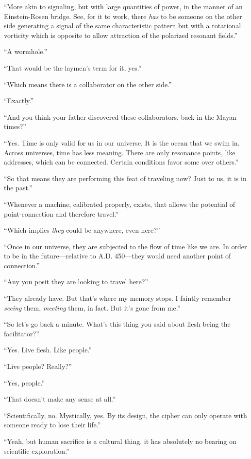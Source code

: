 \documentclass[
]{article}
\begin{document}
``More akin to signaling, but with large quantities of power, in the
manner of an Einstein-Rosen bridge. See, for it to work, there
\emph{has} to be someone on the other side generating a signal of the
same characteristic pattern but with a rotational vorticity which is
opposite to allow attraction of the polarized resonant fields.''

``A wormhole.''

``That would be the laymen's term for it, yes.''

``Which means there is a collaborator on the other side.''

``Exactly.''

``And you think your father discovered these collaborators, back in the
Mayan times?''

``Yes. Time is only valid for us in our universe. It is the ocean that
we swim in. Across universes, time has less meaning. There are only
resonance points, like addresses, which can be connected. Certain
conditions favor some over others.''

``So that means they are performing this feat of traveling now? Just to
us, it is in the past.''

``Whenever a machine, calibrated properly, exists, that allows the
potential of point-connection and therefore travel.''

``Which implies \emph{they} could be anywhere, even here?''

``Once in our universe, they are subjected to the flow of time like we
are. In order to be in the future---relative to A.D. 450---they would
need another point of connection.''

``Any you posit they are looking to travel here?''

``They already have. But that's where my memory stops. I faintly
remember \emph{seeing} them, \emph{meeting} them, in fact. But it's gone
from me.''

``So let's go back a minute. What's this thing you said about flesh
being the facilitator?''

``Yes. Live flesh. Like people.''

``Live people? Really?''

``Yes, people.''

``That doesn't make any sense at all.''

``Scientifically, no. Mystically, yes. By its design, the cipher can
only operate with someone ready to lose their life.''

``Yeah, but human sacrifice is a cultural thing, it has absolutely no
bearing on scientific exploration.''
\end{document}
